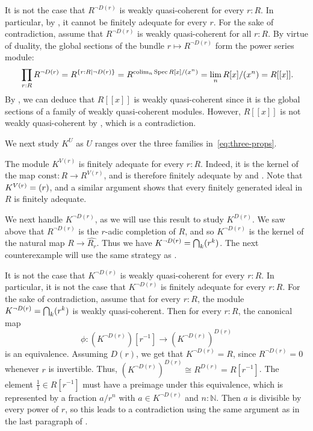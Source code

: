 \begin{counterexample}\label{cex:exp-not-Dr-wqc}
  It is not the case that $R^{\lnot D(r)}$ is weakly quasi-coherent for every $r : R$.
  In particular, by , it cannot be finitely adequate for every $r$.
  For the sake of contradiction, assume that $R^{\lnot D(r)}$ is weakly quasi-coherent for all $r : R$.
  By virtue of duality, the global sections of the bundle ${r \mapsto R^{\lnot D(r)}}$ form the power series module:
  \[
    \prod_{r : R} R^{\lnot D(r)} = R^{\{r:R | \lnot D(r)\}}
    = R^{\mathrm{colim}_n \Spec R[x]/\ideal{x^n}}
    = \lim_n R[x]/\ideal{x^n} = R[[x]]\rlap{.}
  \]
  By \cite[Lemma 7.1.10]{draft}, we can deduce that $R[[x]]$ is weakly quasi-coherent since it is the global sections of a family of weakly quasi-coherent modules.
  However, $R[[x]]$ is not weakly quasi-coherent by \cite[Proposition A.0.5]{draft}, which is a contradiction.
\end{counterexample}

\smallskip

We next study $K^U$ as $U$ ranges over the three families in~\eqref{eq:three-props}.

\begin{example}\label{ex:K^V(r)-fin-adeq}
  The module $K^{V(r)}$ is finitely adequate for every $r : R$.
  Indeed, it is the kernel of the map $\mathrm{const} : R \to R^{V(r)}$,
  and is therefore finitely adequate by  and .
  Note that $K^{V(r)} = (r)$, and a similar argument shows that every finitely generated
  ideal in $R$ is finitely adequate.
\end{example}

We next handle $K^{\lnot D(r)}$, as we will use this result to study $K^{D(r)}$.
We saw above that $R^{\lnot D(r)}$ is the $r$-adic completion of $R$, and so
$K^{\lnot D(r)}$ is the kernel of the natural map $R \to \hat{R_r}$.
Thus we have $K^{\lnot D(r)} = \bigcap_k (r^k)$.
The next counterexample will use the same strategy as .

\begin{counterexample}\label{cex:K-not-Dr-not-wqc}
  It is not the case that $K^{\lnot D(r)}$ is weakly quasi-coherent for every $r : R$.
  In particular, it is not the case that $K^{\lnot D(r)}$ is finitely adequate for every $r : R$.
  For the sake of contradiction, assume that for every $r : R$,
  the module $K^{\lnot D(r)} = \bigcap_k (r^k)$ is weakly quasi-coherent.
  Then for every $r : R$, the canonical map
  \[
    \phi : (K^{\lnot D(r)})[r^{-1}] \to (K^{\lnot D(r)})^{D(r)}
  \]
  is an equivalence.
  Assuming $D(r)$, we get that $K^{\lnot D(r)} = R$, since $R^{\lnot D(r)} = 0$ whenever $r$ is invertible.
  Thus, $(K^{\lnot D(r)})^{D(r)} \cong R^{D(r)} = R[r^{-1}]$.
  The element $\frac{1}{1} \in R[r^{-1}]$ must have a preimage under this equivalence, which is represented by a fraction $a/r^n$ with $a \in K^{\lnot D(r)}$ and $n : \mathbb{N}$.
  Then $a$ is divisible by every power of $r$, so this leads to a contradiction using
  the same argument as in the last paragraph of .
\end{counterexample}

